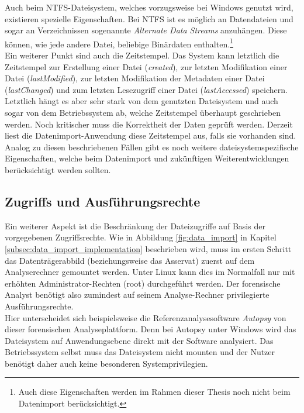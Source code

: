 \noindent
Auch beim NTFS-Dateisystem, welches vorzugsweise bei Windows genutzt wird, existieren spezielle Eigenschaften. Bei NTFS ist es möglich an Datendateien und sogar an Verzeichnissen sogenannte \textit{Alternate Data Streams} anzuhängen. Diese können, wie jede andere Datei, beliebige Binärdaten enthalten.\footnote{Auch diese Eigenschaften werden im Rahmen dieser Thesis noch nicht beim Datenimport berücksichtigt.}\\

\noindent
Ein weiterer Punkt sind auch die Zeitstempel. Das System kann letztlich die Zeitstempel zur Erstellung einer Datei (\textit{created}), zur letzten Modifikation einer Datei (\textit{lastModified}), zur letzten Modifikation der Metadaten einer Datei (\textit{lastChanged}) und zum letzten Lesezugriff einer Datei (\textit{lastAccessed}) speichern. Letztlich hängt es aber sehr stark von dem genutzten Dateisystem und auch sogar von dem Betriebssystem ab, welche Zeitstempel überhaupt geschrieben werden. Noch kritischer muss die Korrektheit der Daten geprüft werden. Derzeit liest die Datenimport-Anwendung diese Zeitstempel aus, falls sie vorhanden sind.\\

\noindent
Analog zu diesen beschriebenen Fällen gibt es noch weitere dateisystemspezifische Eigenschaften, welche beim Datenimport und zukünftigen Weiterentwicklungen berücksichtigt werden sollten. 

\subsection{Zugriffs und Ausführungsrechte}
\label{subsec:data_import_access_rights}
Ein weiterer Aspekt ist die Beschränkung der Dateizugriffe auf Basis der vorgegebenen Zugriffsrechte. Wie in Abbildung \ref{fig:data_import} in Kapitel \ref{subsec:data_import_implementation} beschrieben wird, muss im ersten Schritt das Datenträgerabbild (beziehungsweise das Asservat) zuerst auf dem Analyserechner gemountet werden. Unter Linux kann dies im Normalfall nur mit erhöhten Administrator-Rechten (root) durchgeführt werden. Der forensische Analyst benötigt also zumindest auf seinem Analyse-Rechner privilegierte Ausführungsrechte.\\
Hier unterscheidet sich beispielsweise die Referenzanalysesoftware \textit{Autopsy} von dieser forensischen Analyseplattform. Denn bei Autopsy unter Windows wird das Dateisystem auf Anwendungsebene direkt mit der Software analysiert. Das Betriebssystem selbst muss das Dateisystem nicht mounten und der Nutzer benötigt daher auch keine besonderen Systemprivilegien.\\

